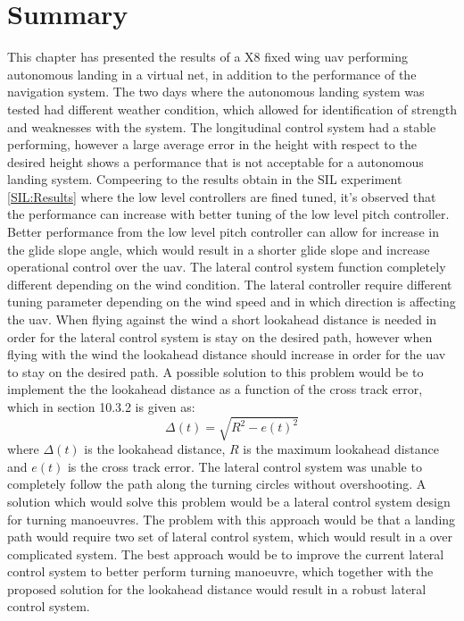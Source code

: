 \section{Summary}
This chapter has presented the results of a X8 fixed wing \gls{uav} performing autonomous landing in a virtual net, in addition to the performance of the navigation system. The two days where the autonomous landing system was tested had different weather condition, which allowed for identification of strength and weaknesses with the system. The longitudinal control system had a stable performing, however a large average error in the height with respect to the desired height shows a performance that is not acceptable for a autonomous landing system. Compeering to the results obtain in the SIL experiment \ref{SIL:Results} where the low level controllers are fined tuned, it's observed that the performance can increase with better tuning of the low level pitch controller. Better performance from the low level pitch controller can allow for increase in the glide slope angle, which would result in a shorter glide slope and increase operational control over the \gls{uav}. 
The lateral control system function completely different depending on the wind condition. The lateral controller require different tuning parameter depending on the wind speed and in which direction is affecting the \gls{uav}. When flying against the wind a short lookahead distance is needed in order for the lateral control system is stay on the desired path, however when flying with the wind the lookahead distance should increase in order for the \gls{uav} to stay on the desired path. A possible solution to this problem would be to implement the the lookahead distance as a function of the cross track error, which in \citep{fossen2011handbook} section 10.3.2 is given as:
\begin{equation}
\Delta(t) = \sqrt{R^2 - e(t)^2}
\end{equation}
where $\Delta(t)$ is the lookahead distance, $R$ is the maximum lookahead distance and $e(t)$ is the cross track error. The lateral control system was unable to completely follow the path along the turning circles without overshooting. A solution which would solve this problem would be a lateral control system design for turning manoeuvres. The problem with this approach would be that a landing path would require two set of lateral control system, which would result in a over complicated system. The best approach would be to improve the current lateral control system to better perform turning manoeuvre, which together with the proposed solution for the lookahead distance would result in a robust lateral control system.

